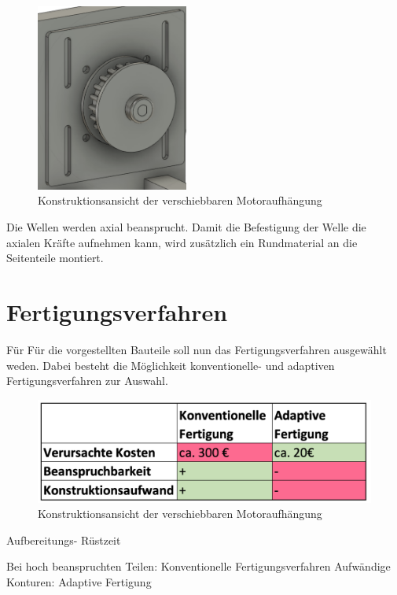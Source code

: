 \begin{figure}[h]
	\centering
	\includegraphics[width=5cm]{motoraufhaengung.png}
	\caption{Konstruktionsansicht der verschiebbaren Motoraufhängung}
	\label{pic:motoraufhaengung}
\end{figure}

Die Wellen werden axial beansprucht. Damit die Befestigung der Welle die axialen Kräfte aufnehmen kann, wird zusätzlich ein Rundmaterial an die Seitenteile montiert. 


\section{Fertigungsverfahren}
Für 
Für die vorgestellten Bauteile soll nun das Fertigungsverfahren ausgewählt weden. Dabei besteht die Möglichkeit konventionelle- und adaptiven Fertigungsverfahren zur Auswahl.


\begin{figure}[h]
	\centering
	\includegraphics[width=12cm]{fertigungsverfahren.png}
	\caption{Konstruktionsansicht der verschiebbaren Motoraufhängung}
	\label{pic:fertigungsverfahren}
\end{figure}


Aufbereitungs-  Rüstzeit 

Bei hoch beanspruchten Teilen: Konventionelle Fertigungsverfahren 
Aufwändige Konturen: Adaptive Fertigung


	